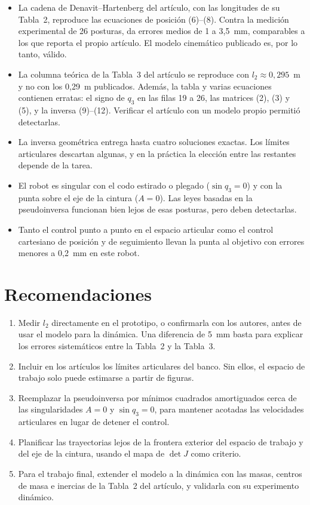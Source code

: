 \documentclass[11pt,a4paper]{article}
\begin{document}
\begin{itemize}
\item La cadena de Denavit--Hartenberg del artículo, con las longitudes de su Tabla~2, reproduce las ecuaciones de posición (6)--(8). Contra la medición experimental de 26 posturas, da errores medios de 1 a 3,5~mm, comparables a los que reporta el propio artículo. El modelo cinemático publicado es, por lo tanto, válido.
\item La columna teórica de la Tabla~3 del artículo se reproduce con \(l_2\approx 0{,}295\)~m y no con los 0,29~m publicados. Además, la tabla y varias ecuaciones contienen erratas: el signo de \(q_3\) en las filas 19 a 26, las matrices (2), (3) y (5), y la inversa (9)--(12). Verificar el artículo con un modelo propio permitió detectarlas.
\item La inversa geométrica entrega hasta cuatro soluciones exactas. Los límites articulares descartan algunas, y en la práctica la elección entre las restantes depende de la tarea.
\item El robot es singular con el codo estirado o plegado (\(\sin q_3=0\)) y con la punta sobre el eje de la cintura (\(A=0\)). Las leyes basadas en la pseudoinversa funcionan bien lejos de esas posturas, pero deben detectarlas.
\item Tanto el control punto a punto en el espacio articular como el control cartesiano de posición y de seguimiento llevan la punta al objetivo con errores menores a 0,2~mm en este robot.
\end{itemize}

\section{Recomendaciones}

\begin{enumerate}
\item Medir \(l_2\) directamente en el prototipo, o confirmarla con los autores, antes de usar el modelo para la dinámica. Una diferencia de 5~mm basta para explicar los errores sistemáticos entre la Tabla~2 y la Tabla~3.
\item Incluir en los artículos los límites articulares del banco. Sin ellos, el espacio de trabajo solo puede estimarse a partir de figuras.
\item Reemplazar la pseudoinversa por mínimos cuadrados amortiguados cerca de las singularidades \(A=0\) y \(\sin q_3=0\), para mantener acotadas las velocidades articulares en lugar de detener el control.
\item Planificar las trayectorias lejos de la frontera exterior del espacio de trabajo y del eje de la cintura, usando el mapa de \(\det J\) como criterio.
\item Para el trabajo final, extender el modelo a la dinámica con las masas, centros de masa e inercias de la Tabla~2 del artículo, y validarla con su experimento dinámico.
\end{enumerate}
\end{document}
